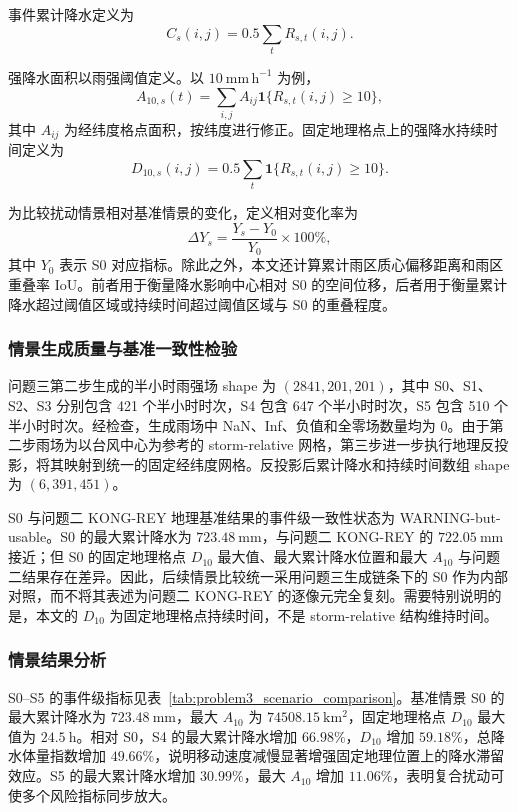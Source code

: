 事件累计降水定义为
\begin{equation}
C_s(i,j)=0.5\sum_t R_{s,t}(i,j).
\end{equation}

强降水面积以雨强阈值定义。以 $10\ \mathrm{mm\,h^{-1}}$ 为例，
\begin{equation}
A_{10,s}(t)=\sum_{i,j} A_{ij}\mathbf{1}\{R_{s,t}(i,j)\ge 10\},
\end{equation}
其中 $A_{ij}$ 为经纬度格点面积，按纬度进行修正。固定地理格点上的强降水持续时间定义为
\begin{equation}
D_{10,s}(i,j)=0.5\sum_t \mathbf{1}\{R_{s,t}(i,j)\ge 10\}.
\end{equation}

为比较扰动情景相对基准情景的变化，定义相对变化率为
\begin{equation}
\Delta Y_s=\frac{Y_s-Y_0}{Y_0}\times 100\%,
\end{equation}
其中 $Y_0$ 表示 S0 对应指标。除此之外，本文还计算累计雨区质心偏移距离和雨区重叠率 IoU。前者用于衡量降水影响中心相对 S0 的空间位移，后者用于衡量累计降水超过阈值区域或持续时间超过阈值区域与 S0 的重叠程度。

\subsubsection{情景生成质量与基准一致性检验}

问题三第二步生成的半小时雨强场 shape 为 $(2841,201,201)$，其中 S0、S1、S2、S3 分别包含 421 个半小时时次，S4 包含 647 个半小时时次，S5 包含 510 个半小时时次。经检查，生成雨场中 NaN、Inf、负值和全零场数量均为 0。由于第二步雨场为以台风中心为参考的 storm-relative 网格，第三步进一步执行地理反投影，将其映射到统一的固定经纬度网格。反投影后累计降水和持续时间数组 shape 为 $(6,391,451)$。

S0 与问题二 KONG-REY 地理基准结果的事件级一致性状态为 WARNING-but-usable。S0 的最大累计降水为 $723.48\ \mathrm{mm}$，与问题二 KONG-REY 的 $722.05\ \mathrm{mm}$ 接近；但 S0 的固定地理格点 $D_{10}$ 最大值、最大累计降水位置和最大 $A_{10}$ 与问题二结果存在差异。因此，后续情景比较统一采用问题三生成链条下的 S0 作为内部对照，而不将其表述为问题二 KONG-REY 的逐像元完全复刻。需要特别说明的是，本文的 $D_{10}$ 为固定地理格点持续时间，不是 storm-relative 结构维持时间。

\subsubsection{情景结果分析}

S0--S5 的事件级指标见表~\ref{tab:problem3_scenario_comparison}。基准情景 S0 的最大累计降水为 $723.48\ \mathrm{mm}$，最大 $A_{10}$ 为 $74508.15\ \mathrm{km^2}$，固定地理格点 $D_{10}$ 最大值为 $24.5\ \mathrm{h}$。相对 S0，S4 的最大累计降水增加 $66.98\%$，$D_{10}$ 增加 $59.18\%$，总降水体量指数增加 $49.66\%$，说明移动速度减慢显著增强固定地理位置上的降水滞留效应。S5 的最大累计降水增加 $30.99\%$，最大 $A_{10}$ 增加 $11.06\%$，表明复合扰动可使多个风险指标同步放大。

